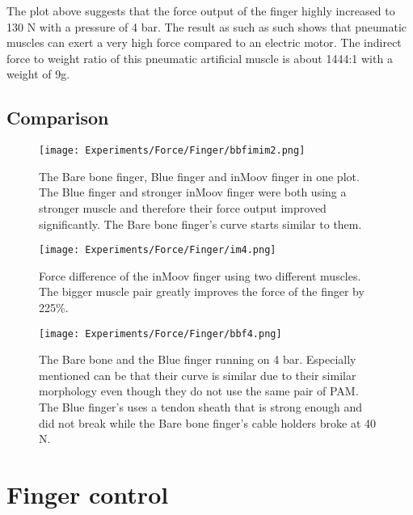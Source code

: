 \documentclass[main]{subfiles}
\begin{document}
The plot above suggests that the force output of the finger highly increased to 130 N with a pressure of 4 bar. The result as such as such shows that pneumatic muscles can exert a very high force compared to an electric motor. The indirect force to weight ratio of this pneumatic artificial muscle is about 1444:1 with a weight of 9g. 

\subsection{Comparison}

\begin{figure}[htp]
\centering
\texttt{[image: Experiments/Force/Finger/bbfimim2.png]}
\caption[Overview of finger force]{The Bare bone finger, Blue finger and inMoov finger in one plot. The Blue finger and stronger inMoov finger were both using a stronger muscle and therefore their force output improved significantly. The Bare bone finger's curve starts similar to them.}
\label{bbfimim2}
\end{figure}


\begin{figure}[htp]
\centering
\texttt{[image: Experiments/Force/Finger/im4.png]}
\caption[Finger force difference of inMoov fingers]{Force difference of the inMoov finger using two different muscles. The bigger muscle pair greatly improves the force of the finger by 225\%.}
\label{im4}
\end{figure}


\begin{figure}[htp]
\centering
\texttt{[image: Experiments/Force/Finger/bbf4.png]}
\caption[Bare bone and Blue finger force comparison]{The Bare bone and the Blue finger running on 4 bar. Especially mentioned can be that their curve is similar due to their similar morphology even though they do not use the same pair of PAM. The Blue finger's uses a tendon sheath that is strong enough and did not break while the Bare bone finger's cable holders broke at 40 N.}
\label{bbf4}
\end{figure}

\section{Finger control}
\end{document}
